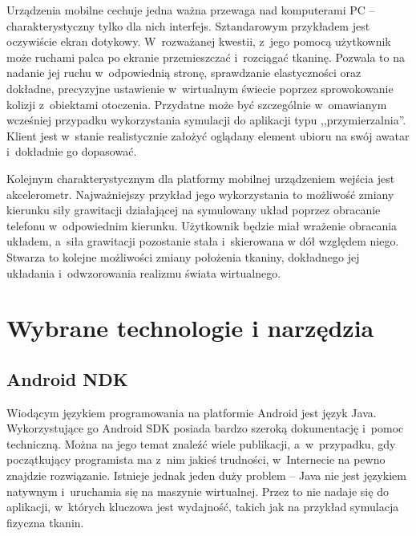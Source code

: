 		
		Urządzenia mobilne cechuje jedna ważna przewaga nad komputerami PC -- charakterystyczny tylko dla nich interfejs. Sztandarowym przykładem jest oczywiście ekran dotykowy. W~rozważanej kwestii, z~jego pomocą użytkownik może ruchami palca po ekranie przemieszczać i~rozciągać tkaninę. Pozwala to na nadanie jej ruchu w~odpowiednią stronę, sprawdzanie elastyczności oraz dokładne, precyzyjne ustawienie w~wirtualnym świecie poprzez sprowokowanie kolizji z~obiektami otoczenia. Przydatne może być szczególnie w~omawianym wcześniej przypadku wykorzystania symulacji do aplikacji typu ,,przymierzalnia''. Klient jest w~stanie realistycznie założyć oglądany element ubioru na swój awatar i~dokładnie go dopasować. 
		
		Kolejnym charakterystycznym dla platformy mobilnej urządzeniem wejścia jest akcelerometr. Najważniejszy przykład jego wykorzystania to możliwość zmiany kierunku siły grawitacji działającej na symulowany układ poprzez obracanie telefonu w~odpowiednim kierunku. Użytkownik będzie miał wrażenie obracania układem, a~siła grawitacji pozostanie stała i~skierowana w dół względem niego. Stwarza to kolejne możliwości zmiany położenia tkaniny, dokładnego jej układania i~odwzorowania realizmu świata wirtualnego.

	
	\section{Wybrane technologie i narzędzia}
	\label{t:technologie:narzedzia}
	
		\subsection{Android NDK}
		\label{t:technologie:narzedzia:ndk}
		
		
		Wiodącym językiem programowania na platformie Android jest język Java. Wykorzystujące go Android SDK posiada bardzo szeroką dokumentację i~pomoc techniczną. Można na jego temat znaleźć wiele publikacji, a~w~przypadku, gdy początkujący programista ma z~nim jakieś trudności, w~Internecie na pewno znajdzie rozwiązanie. Istnieje jednak jeden duży problem -- Java nie jest językiem natywnym i~uruchamia się na maszynie wirtualnej. Przez to nie nadaje się do aplikacji, w~których kluczowa jest wydajność, takich jak na przykład symulacja fizyczna tkanin.
		
